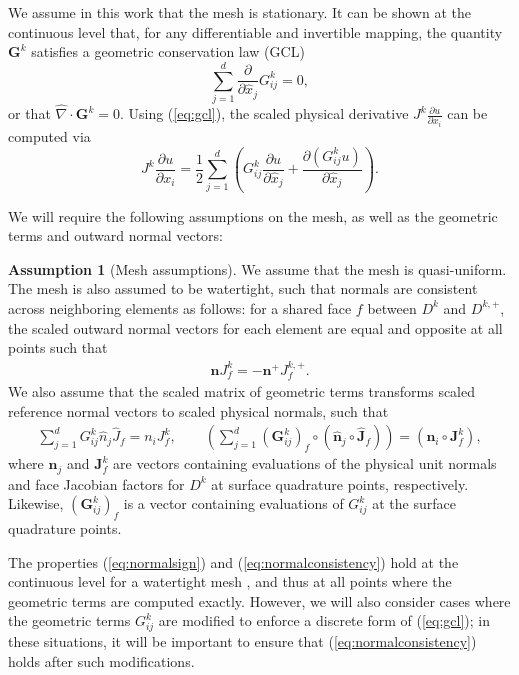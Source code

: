 \documentclass[10pt]{amsart}
\theoremstyle{definition}
\theoremstyle{lemma}
\theoremstyle{theorem}
\theoremstyle{assumption}
\newtheorem{assumption}{Assumption}
\renewcommand{\hat}{\widehat}
\newcommand{\pd}[2]{\frac{\partial#1}{\partial#2}}
\newcommand{\LRp}[1]{\left( #1 \right)}
\newcommand{\Grad} {\ensuremath{\nabla}}
\begin{document}
{We assume in this work that the mesh is stationary.  It can be shown at the continuous level that, for any differentiable and invertible mapping, the quantity $\bm{G}^k$ satisfies a geometric conservation law (GCL) \cite{kopriva2006metric, thomas1979geometric}
\begin{equation}
\sum_{j=1}^d\pd{}{\hat{x}_j}G^k_{ij} = 0,
\label{eq:gcl}
\end{equation}
or that $\hat{\Grad}\cdot \bm{G}^k = 0$.  Using (\ref{eq:gcl}), the scaled physical derivative $J^k\pd{u}{x_i}$ can be computed via
\begin{equation}
J^k\pd{u}{x_i} = \frac{1}{2}\sum_{j=1}^d \LRp{G^k_{ij}\pd{u}{\hat{x}_j} + \pd{\LRp{G^k_{ij}u}}{\hat{x}_j}}.
\label{eq:splitderiv}
\end{equation}

We will require the following assumptions on the mesh, as well as the geometric terms and outward normal vectors:
\begin{assumption}[Mesh assumptions]
We assume that the mesh is quasi-uniform.  The mesh is also assumed to be watertight, such that normals are consistent across neighboring elements as follows: for a shared face $f$ between $D^k$ and $D^{k,+}$, the scaled outward normal vectors for each element are equal and opposite at all points such that 
\begin{align}
\bm{n}J^k_f = -\bm{n}^+J^{k,+}_f.
\label{eq:normalsign}
\end{align}
We also assume that the scaled matrix of geometric terms transforms scaled reference normal vectors to scaled physical normals, such that
\begin{align}
\sum_{j=1}^d G^k_{ij} \hat{n}_j\hat{J}_f = n_i J^k_f, \qquad \LRp{\sum_{j=1}^d \LRp{\bm{G}^k_{ij}}_f \circ\LRp{\hat{\bm{n}}_j\circ\hat{\bm{J}}_f}}
= \LRp{\bm{n}_i\circ\bm{J}^k_f},
\label{eq:normalconsistency}
\end{align}
where $\bm{n}_j$ and $\bm{J}^k_f$ are vectors containing evaluations of the physical unit normals and face Jacobian factors for $D^k$ at surface quadrature points, respectively.
Likewise, $\LRp{\bm{G}^k_{ij}}_f$ is a vector containing evaluations of $G^k_{ij}$ at the surface quadrature points.
\label{ass:norm}
\end{assumption}
The properties (\ref{eq:normalsign}) and (\ref{eq:normalconsistency}) hold at the continuous level for a watertight mesh \cite{ciarlet1978finite}, and thus at all points where the geometric terms are computed exactly.  However, we will also consider cases where the geometric terms $G^k_{ij}$ are modified to enforce a discrete form of (\ref{eq:gcl}); in these situations, it will be important to ensure that (\ref{eq:normalconsistency}) holds after such modifications.  

}
\end{document}
